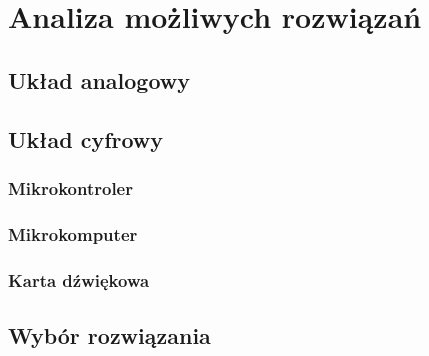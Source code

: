 \chapter{Analiza możliwych rozwiązań}
\label{cha:możliwe_układy}

\section{Układ analogowy}
\label{sec:analog}

\section{Układ cyfrowy}
\label{sec:digital}

\subsection{Mikrokontroler}
\label{uC}

\subsection{Mikrokomputer}
\label{mikrokomp}

\subsection{Karta dźwiękowa}
\label{soundcard}

\section{Wybór rozwiązania}
\label{sec:wybór}
